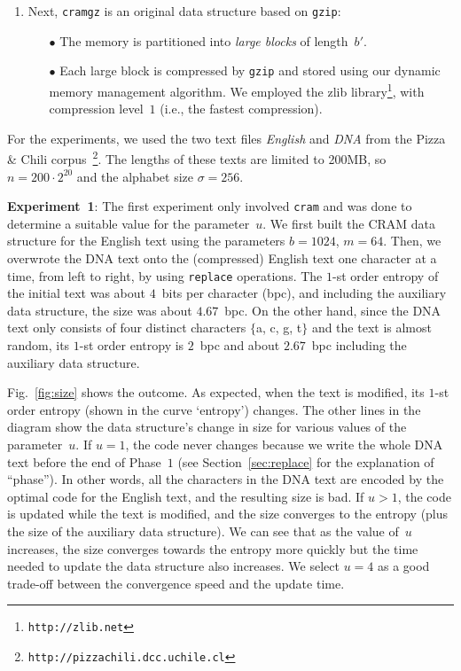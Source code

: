 \documentclass{llncs}
\begin{document}
\begin{enumerate}
\medskip

\item
Next, \texttt{cramgz} is an original data structure based on \texttt{gzip}:

\smallskip

\begin{itemize}
\item[{\raise0.3pt\hbox{$\bullet$}}]
The memory is partitioned into \emph{large blocks} of length~$b'$.

\smallskip
\item[{\raise0.3pt\hbox{$\bullet$}}]
Each large block is compressed by \texttt{gzip} and stored using our
dynamic memory management algorithm.
We employed the zlib library\footnote{\texttt{http://zlib.net}}, with
compression level~$1$ (i.e., the fastest compression).
\end{itemize}
\end{enumerate}


\noindent
For the experiments, we used the two text files \emph{English} and \emph{DNA}
from the Pizza \& Chili
corpus~\footnote{\texttt{http://pizzachili.dcc.uchile.cl}}.
The lengths of these texts are limited to 200MB, so $n = 200 \cdot 2^{20}$
and the alphabet size $\sigma = 256$.

\bigskip

\noindent
\textbf{Experiment~1}:
The first experiment only involved \texttt{cram} and was done to determine
a suitable value for the parameter~$u$.
We first built the CRAM data structure for the English text using the
parameters $b = 1024$, $m = 64$.
Then, we overwrote the DNA text onto the (compressed) English text one
character at a time, from left to right, by using \texttt{replace}
operations.
The $1$-st order entropy of the initial text was about $4$~bits per
character (bpc), and including the auxiliary data structure, the size was
about $4.67$~bpc.
On the other hand, since the DNA text only consists of four distinct
characters $\{$a, c, g, t$\}$ and the text is almost random,
its $1$-st order entropy is $2$~bpc and
about $2.67$~bpc including the auxiliary data structure.

Fig.~\ref{fig:size} shows the outcome.
As expected, when the text is modified, its $1$-st order entropy (shown in
the curve `entropy') changes.
The other lines in the diagram show the data structure's change in size for
various values of the parameter~$u$.
If $u = 1$, the code never changes because we write the whole DNA text
before the end of Phase~$1$ (see Section~\ref{sec:replace} for the
explanation of ``phase'').
In other words, all the characters in the DNA text are encoded by the optimal
code for the English text, and the resulting size is bad.
If $u > 1$, the code is updated while the text is modified, and the size
converges to the entropy (plus the size of the auxiliary data structure).
We can see that as the value of~$u$ increases, the size converges towards
the entropy more quickly but the time needed to update the data structure
also increases.
We select $u = 4$ as a good trade-off between the convergence speed and the
update time.
\end{document}
